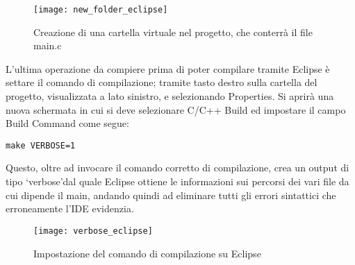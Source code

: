 \begin{figure}[H]
\texttt{[image: new\_folder\_eclipse]}
\centering
\caption{Creazione di una cartella virtuale nel progetto, che conterrà il file main.c}
\label{makefile_proj}
\end{figure}

\begin{samepage}
L'ultima operazione da compiere prima di poter compilare tramite Eclipse è settare il comando di compilazione; tramite tasto destro sulla cartella del progetto, visualizzata a lato sinistro, e selezionando Properties. Si aprirà una nuova schermata in cui si deve selezionare C/C++ Build ed impostare il campo Build Command come segue: 

\begin{verbatim}
make VERBOSE=1
\end{verbatim}
\end{samepage}

Questo, oltre ad invocare il comando corretto di compilazione, crea un output di tipo \lq verbose\rq dal quale Eclipse ottiene le informazioni sui percorsi dei vari file da cui dipende il main, andando quindi ad eliminare tutti gli errori sintattici che erroneamente l'IDE evidenzia.

\begin{figure}[H]
\texttt{[image: verbose\_eclipse]}
\centering
\caption{Impostazione del comando di compilazione su Eclipse}
\end{figure}

